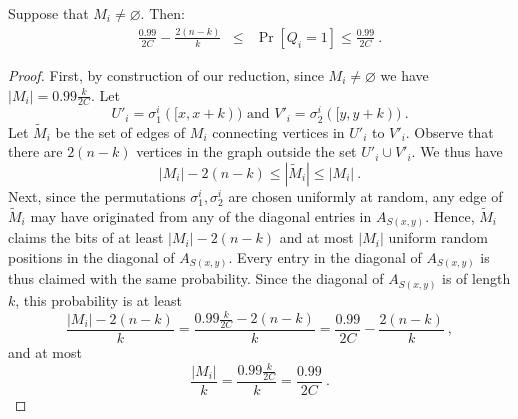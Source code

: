 \begin{lemma}\label{lem:learn}
 Suppose that $M_i \neq \varnothing$. Then:
 \begin{eqnarray*}
\frac{0.99}{2C} - \frac{2(n - k)}{k} & \le & \Pr \left[ Q_i = 1 \right] \le \frac{0.99}{2C} \ .
%
 \end{eqnarray*}
 
%
\end{lemma}
\begin{proof}
 First, by construction of our reduction, since $M_i \neq \varnothing$ we have 
 $|M_i| = 0.99 \frac{k}{2C}$. 
 Let 
 $$U'_i = \sigma_1^i([x, x+k)) \mbox{ and } V'_i = \sigma_2^i([y, y+k)) \ .$$ 
 Let $\tilde{M}_i$ be the set of edges of $M_i$ connecting vertices in $U'_i$ to $V'_i$. Observe that there are
 $2(n-k)$ vertices in the graph outside the set $U'_i \cup V'_i$. We thus 
 have  
 $$|M_i| - 2(n-k) \le |\tilde{M}_i| \le |M_i|  \ .$$ 
 Next, since the permutations $\sigma^i_1, \sigma^i_2$ are chosen uniformly at random, any edge of $\tilde{M}_i$
 may have originated from any of the diagonal entries in $A_{S(x, y)}$. Hence, $\tilde{M}_i$ claims the bits
 of at least $|M_i| - 2(n-k)$ and at most $|M_i|$ uniform random positions in the diagonal of $A_{S(x, y)}$.
 Every entry in the diagonal of $A_{S(x,y)}$ is thus claimed with the same probability.
 Since the diagonal of $A_{S(x,y)}$ is of length $k$, this probability is at least
 $$ 
 \frac{|M_i| - 2(n-k)}{k} = \frac{0.99 \frac{k}{2C} - 2(n-k)}{k} = \frac{0.99}{2C} - \frac{2(n - k)}{k} \ ,
 $$
 and at most
 $$\frac{|M_i|}{k} = \frac{0.99 \frac{k}{2C}}{k} = \frac{0.99}{2C} \ .$$ 
\end{proof}



%
%

%
%
%
%
%
%
%
%
%
%
%
%



